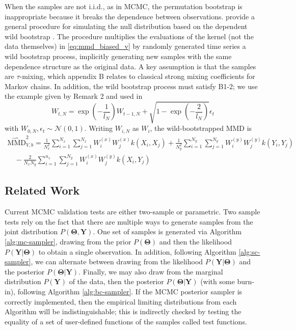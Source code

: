 \documentclass[a4paper,12pt]{article}
\begin{document}
When the samples are not i.i.d., as in MCMC, the permutation bootstrap is inappropriate because it breaks the dependence between observations. \cite{chwialkowski_wild_2016} provide a general procedure for simulating the null distribution based on the dependent wild bootstrap \cite{shao_dependent_2010}. The procedure multiplies the evaluations of the kernel (not the data themselves) in \eqref{eq:mmd_biased_v} by randomly generated time series a wild bootstrap process, implicitly generating new samples with the same dependence structure as the original data. A key assumption is that the samples are $\tau$-mixing, which \cite{chwialkowski_wild_2016} appendix B relates to classical strong mixing coefficients for Markov chains. In addition, the wild bootstrap process must satisfy \cite{leucht_dependent_2013} B1-2; we use the example given by \cite{leucht_dependent_2013} Remark 2 and used in \cite{chwialkowski_wild_2016}
\begin{equation}
    W_{t, N}=\exp{\left(-\frac{1}{l_{N}}\right)} W_{t-1, N}+\sqrt{1-\exp{\left(-\frac{2}{l_{N}}\right)}} \epsilon_{t}
    \label{eq:wb_process}
\end{equation}
with $W_{0,N}, \epsilon_{t} \sim \mathcal{N}(0,1)$. Writing $W_{i,N}$ as $W_{i}$, the wild-bootstrapped MMD is
\begin{equation}
    \begin{array}{c}
    \widehat{\mathrm{MMD}}^{2}_{V, b}=\frac{1}{N_{x}^{2}} \sum_{i=1}^{N_{x}} \sum_{j=1}^{N_{x}} W_{i}^{(x)} W_{j}^{(x)} k\left(X_{i}, X_{j}\right)+\frac{1}{N_{y}^{2}} \sum_{i=1}^{N_{y}} \sum_{j=1}^{N_{y}} W_{i}^{(y)} W_{j}^{(y)} k\left(Y_{i}, Y_{j}\right) \\
    \quad-\frac{2}{N_{x} N_{y}} \sum_{i=1}^{n_{s}} \sum_{j=1}^{N_{y}} W_{i}^{(x)} W_{j}^{(y)} k\left(X_{i}, Y_{j}\right)
    \end{array}
    \label{eq:wb_mmd}
\end{equation}

\subsection{Related Work}
Current MCMC validation tests are either two-sample or parametric. Two sample tests rely on the fact that there are multiple ways to generate samples from the joint distribution $P(\mathbf{\Theta}, \mathbf{Y})$. One set of samples is generated via Algorithm \ref{alg:mc-sampler}, drawing from the prior $P(\mathbf{\Theta})$ and then the likelihood $P(\mathbf{Y}| \mathbf{\Theta})$ to obtain a single observation. In addition, following Algorithm \ref{alg:sc-sampler}, we can alternate between drawing from the likelihood $P(\mathbf{Y}| \mathbf{\Theta})$ and the posterior $P(\mathbf{\Theta}|\mathbf{Y})$. Finally, we may also draw from the marginal distribution $P(\mathbf{Y})$ of the data, then the posterior $P(\mathbf{\Theta} | \mathbf{Y})$ (with some burn-in), following Algorithm \ref{alg:bc-sampler}. If the MCMC posterior sampler is correctly implemented, then the empirical limiting distributions from each Algorithm will be indistinguishable; this is indirectly checked by testing the equality of a set of user-defined functions of the samples called test functions.
\end{document}
